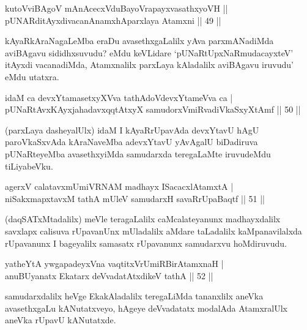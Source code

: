 \begin{shl}
kutoV\s viBAgoV mAnAcecxVduBayoVrapayxvasathxyoVH ||  \\
pUNARditAyxdivacanAnamxhAparxlaya Atamxni \hfill||  49 ||  
\end{shl}

\begin{artha}
kAyaRkAraNagaLeMba eraDu avasethxgaLalilx yAva parxmANadiMda aviBAgavu sididhxsuvudu? eMdu keVLidare `pUNaRtUpxNaRmudacayxteV' itAyxdi vacanadiMda, Atamxnalilx parxLaya kAladalilx aviBAgavu iruvudu' eMdu utatxra.
\end{artha}

\begin{shl}
idaM ca devxYtamasetxyXVva tathA\s doV\s devxYtameVva ca  | \\
pUNaRtAvxKAyxja{\null}hadavxqqtAtxyX samudorxVmiRvadiVkaSxyXtAmf \hfill||  50 ||  
\end{shl}

\begin{artha}
(parxLaya dasheyalUlx) idaM I kAyaRrUpavAda devxYtavU hAgU paroVkaSxvAda kAraNaveMba adevxYtavU yAvAgalU biDadiruva pUNaRteyeMba avasethxyiMda samudarxda teregaLaMte iruvudeMdu tiLiyabeVku.
\end{artha}

\begin{shl}
agerxV calatavxmUmiVRNAM madhayx ISacacxlAtamxtA  | \\
niSakxmapxtavxM tathA mUleV samudarxH savaRrUpaBaqtf \hfill||  51 ||  
\end{shl}

\begin{artha}
(daqSATxMtadalilx) meVle teragaLalilx caMcalateyanunx madhayxdalilx savxlapx calisuva rUpavanUnx mUladalilx aMdare taLadalilx kaMpanavilalxda rUpavanunx I bageyalilx samasatx rUpavanunx samudarxvu hoMdiruvudu.
\end{artha}

\begin{shl}
yatheYtA ywgapadeyxVna vaqtitxVrUmiRBirAtamxnaH  | \\
anuBUyanatx Ekatarx deVvadatAtxdikeV tathA \hfill||  52 ||  
\end{shl}

\begin{artha}
samudarxdalilx heVge EkakAladalilx teregaLiMda tananxlilx aneVka avasethxgaLu kANutatxveyo, hAgeye deVvadatatx modalAda AtamxralUlx aneVka rUpavU kANutatxde.
\end{artha}


